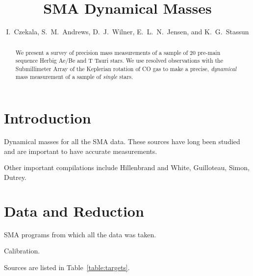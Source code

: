 \documentclass[twocolumn]{aastex6}
\begin{document}
\title{SMA Dynamical Masses}
\author{I.~Czekala, S.~M.~Andrews, D.~J.~Wilner, E.~L.~N.~Jensen, and K.~G.~Stassun}


\begin{abstract}
We present a survey of precision mass measurements of a sample of 20 pre-main sequence Herbig Ae/Be and T Tauri stars. We use resolved observations with the Submillimeter Array of the Keplerian rotation of CO gas to make a precise, \emph{dynamical} mass measurement of a sample of \emph{single} stars.
\end{abstract}


\section{Introduction}

Dynamical masses for all the SMA data. These sources have long been studied and are important to have accurate measurements.

Other important compilations include Hillenbrand and White, Guilloteau, Simon, Dutrey.

\section{Data and Reduction}

SMA programs from which all the data was taken.

Calibration.

Sources are listed in Table~\ref{table:targets}.
\end{document}

